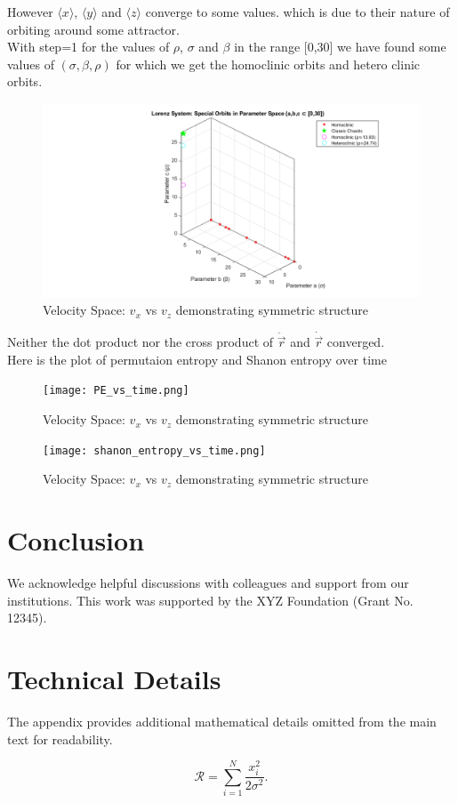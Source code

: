 \documentclass[%
reprint,
amsmath,amssymb,
aps,
floatfix,
]{revtex4-2}
\begin{document}
	However $\langle x\rangle$, $\langle y\rangle$ and  $\langle z\rangle$ converge to some values. which is due to their nature of orbiting around some attractor. \\
	With step=1 for the values of $\rho$, $\sigma$ and $\beta$ in the range [0,30] we have found some values of $(\sigma, \beta, \rho )$ for which we get the homoclinic orbits and hetero clinic orbits.
	\begin{figure}[htbp]
		\centering
		\includegraphics[width=0.8\linewidth]{homoclinic_heteroclinic_points.png}
		\caption{Velocity Space: $v_x$ vs $v_z$ demonstrating symmetric structure}
		\label{fig:vx_vz}
	\end{figure}
	Neither the dot product nor the cross product of $\ddot{\vec{r}}$ and $\dot{\vec{r}}$ converged.\\
	Here is the plot of permutaion entropy and Shanon entropy  over time
	\begin{figure}[htbp]
		\centering
		\texttt{[image: PE\_vs\_time.png]}
		\caption{Velocity Space: $v_x$ vs $v_z$ demonstrating symmetric structure}
		\label{fig:vx_vz}
	\end{figure}
	\begin{figure}[htbp]
		\centering
		\texttt{[image: shanon\_entropy\_vs\_time.png]}
		\caption{Velocity Space: $v_x$ vs $v_z$ demonstrating symmetric structure}
		\label{fig:vx_vz}
	\end{figure}
	\section{Conclusion}
	
	\begin{acknowledgments}
		We acknowledge helpful discussions with colleagues and support from our institutions. This work was supported by the XYZ Foundation (Grant No. 12345).
	\end{acknowledgments}
	
	\appendix
	\section{Technical Details}
	
	The appendix provides additional mathematical details omitted from the main text for readability.
	
	\begin{equation}
		\mathcal{R} = \sum_{i=1}^N \frac{x_i^2}{2\sigma^2}.
		\label{eq:appendix_eq}
	\end{equation}
	
	
	
\end{document}
